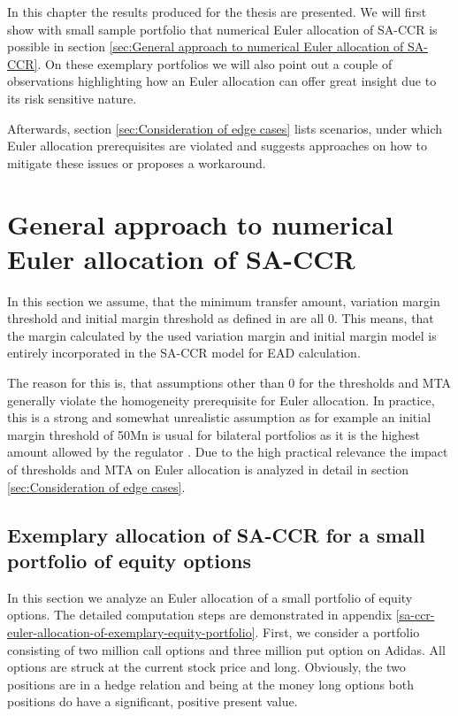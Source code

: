 \documentclass[../Thesis_AHoecherl.tex]{subfiles}
\begin{document}
    In this chapter the results produced for the thesis are presented. We will first show with small sample portfolio that numerical Euler allocation of SA-CCR is possible in section \ref{sec:General approach to numerical Euler allocation of SA-CCR}. On these exemplary portfolios we will also point out a couple of observations highlighting how an Euler allocation can offer great insight due to its risk sensitive nature.

    Afterwards, section \ref{sec:Consideration of edge cases} lists scenarios, under which Euler allocation prerequisites are violated and suggests approaches on how to mitigate these issues or proposes a workaround.

    \section{General approach to numerical Euler allocation of SA-CCR\label{sec:General approach to numerical Euler allocation of SA-CCR}}

    In this section we assume, that the minimum transfer amount, variation margin threshold and initial margin threshold as defined in  are all 0. This means, that the margin calculated by the used variation margin and initial margin model is entirely incorporated in the SA-CCR model for EAD calculation.

    The reason for this is, that assumptions other than 0 for the thresholds and MTA generally violate the homogeneity prerequisite for Euler allocation. In practice, this is a strong and somewhat unrealistic assumption as for example an initial margin threshold of 50Mn is usual for bilateral portfolios as it is the highest amount allowed by the regulator . Due to the high practical relevance the impact of thresholds and MTA on Euler allocation is analyzed in detail in section \ref{sec:Consideration of edge cases}.   

    \subsection{Exemplary allocation of SA-CCR for a small portfolio of equity options}


    In this section we analyze an Euler allocation of a small portfolio of equity options. The detailed computation steps are demonstrated in appendix \ref{sa-ccr-euler-allocation-of-exemplary-equity-portfolio}. 
    First, we consider a portfolio consisting of two million call options and three million put option on Adidas. All options are struck at the current stock price and long. Obviously, the two positions are in a hedge relation and being at the money long options both positions do have a significant, positive present value.
    
\end{document}
